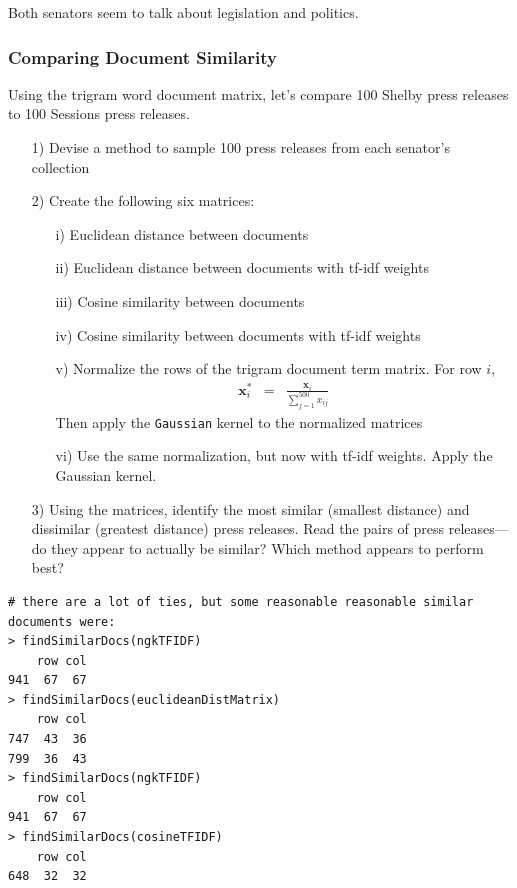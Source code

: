 \documentclass[12pt,letterpaper]{article}
\begin{document}
\noindent Both senators seem to talk about legislation and politics.

\subsubsection*{Comparing Document Similarity}

Using the trigram word document matrix, let's compare 100 Shelby press releases to 100 Sessions press releases.
\begin{itemize}
\item[1)] Devise a method to sample 100 press releases from each senator's collection
\item[2)] Create the following six matrices:
\begin{itemize}
\item[i)] Euclidean distance between documents
\item[ii)] Euclidean distance between documents with tf-idf weights
\item[iii)] Cosine similarity between documents
\item[iv)] Cosine similarity between documents with tf-idf weights
\item[v)] Normalize the rows of the trigram document term matrix.  For row $i$, 
\begin{eqnarray}
\boldsymbol{x}_{i}^{*} & = & \frac{\boldsymbol{x}_{i}}{\sum_{j=1}^{500} x_{ij}} \nonumber 
\end{eqnarray}
Then apply the {\tt Gaussian} kernel to the normalized matrices
\item[vi)] Use the same normalization, but now with tf-idf weights.  Apply the Gaussian kernel.   
\end{itemize}
\item[3)] Using the matrices, identify the most similar (smallest distance) and dissimilar (greatest distance) press releases.  Read the pairs of press releases---do they appear to actually be similar?  Which method appears to perform best?
\end{itemize}



\begin{Verbatim}
# there are a lot of ties, but some reasonable reasonable similar documents were:
> findSimilarDocs(ngkTFIDF)
    row col
941  67  67
> findSimilarDocs(euclideanDistMatrix)
    row col
747  43  36
799  36  43
> findSimilarDocs(ngkTFIDF)
    row col
941  67  67
> findSimilarDocs(cosineTFIDF)
    row col
648  32  32
\end{Verbatim}
\end{document}
